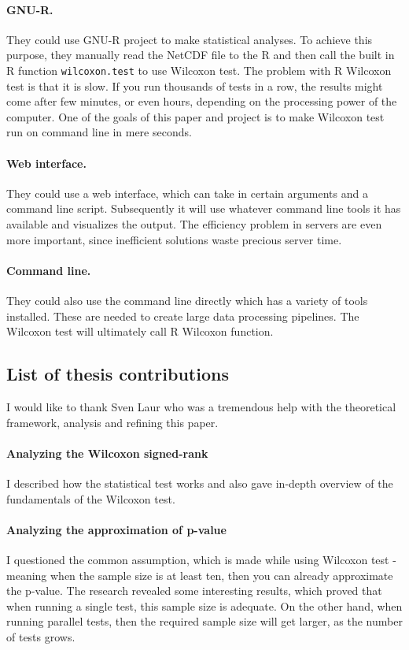 \documentclass[12pt]{article}
\begin{document}
{\paragraph{GNU-R.}
They could use GNU-R project to make statistical analyses. To achieve this purpose, they manually read the NetCDF file to the R and then call the built in R function \texttt{wilcoxon.test} to use Wilcoxon test. The problem with R Wilcoxon test is that it is slow. If you run thousands of tests in a row, the results might come after few minutes, or even hours, depending on the processing power of the computer. One of the goals of this paper and project is to make Wilcoxon test run on command line in mere seconds.
\paragraph{Web interface.}
They could use a web interface, which can take in certain arguments and a command line script. Subsequently it will use whatever command line tools it has available and visualizes the output. The efficiency problem in servers are even more important, since inefficient solutions waste precious server time.

\paragraph{Command line.}
They could also use the command line directly which has a variety of tools installed. These are needed to create large data processing pipelines. The Wilcoxon test will ultimately call R Wilcoxon function.

\subsection{List of thesis contributions}

I would like to thank Sven Laur who was a tremendous help with the theoretical framework, analysis and refining this paper.

\paragraph{Analyzing the Wilcoxon signed-rank\\}
I described how the statistical test works and also gave in-depth overview of the fundamentals of the Wilcoxon test.

\paragraph{Analyzing the approximation of p-value\\}
I questioned the common assumption, which is made while using Wilcoxon test - meaning when the sample size is at least ten, then you can already approximate the p-value. The research revealed some interesting results, which proved that when running a single test, this sample size is adequate. On the other hand, when running parallel tests, then the required sample size will get larger, as the number of tests grows.

}
\end{document}
